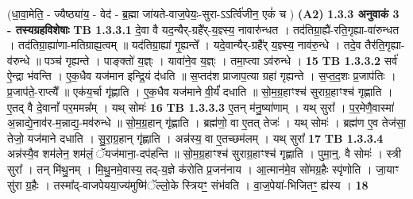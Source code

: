 \documentclass[17pt]{extarticle}
\begin{document}
                  \newline
                                    (धा॒वा॒मेति॒ - ज्यैष्ठ्या॑य॒ - वेद॑ - ब्र॒ह्मा जा॑यते-वाज॒पेयः॒-सुरा-ऽऽर्त्वि॑जीन॒ एकं॑ च ) \textbf{(A2)} \newline \newline
                \textbf{ 1.3.3      अनुवाकं   3 - तस्यग्रहविशेषाः} \newline
                                \textbf{ TB 1.3.3.1} \newline
                  दे॒वा वै यद॒न्यैर्-ग्रहै᳚र्-य॒ज्ञ्स्य॒ नावारु॑न्धत । तद॑तिग्रा॒ह्यै॑-रति॒गृह्या-वा॑रुन्धत । तद॑तिग्रा॒ह्या॑णा-मतिग्राह्य॒त्वम् ॥ यद॑तिग्रा॒ह्या॑ गृ॒ह्यन्ते᳚ । यदे॒वान्यैर्-ग्रहै᳚र् य॒ज्ञ्स्य॒ नाव॑रु॒न्धे । तदे॒व तैर॑ति॒गृह्या-व॑रुन्धे ॥ पञ्च॑ गृह्यन्ते । पाङ्क्तो॑ य॒ज्ञ्ः । यावा॑ने॒व य॒ज्ञ्ः । तमा॒प्त्वा ऽव॑रुन्धे । \textbf{ 15} \newline
                  \newline
                                \textbf{ TB 1.3.3.2} \newline
                  सर्व॑ ऐ॒न्द्रा भ॑वन्ति । ए॒क॒धैव यज॑मान इन्द्रि॒यं द॑धति ॥ स॒प्तद॑श प्राजाप॒त्या ग्रहा॑ गृह्यन्ते । स॒प्त॒द॒शः प्र॒जाप॑तिः । प्र॒जाप॑ते॒-राप्त्यै᳚ ॥ एक॑य॒र्चा गृ॑ह्णाति । ए॒क॒धैव यज॑माने वी॒र्यं॑ दधाति ॥ सो॒म॒ग्र॒हाꣳश्च॑ सुराग्र॒हाꣳश्च॑ गृह्णाति । ए॒तद् वै दे॒वानां᳚ पर॒ममन्न᳚म् । यथ् सोमः॑ \textbf{ 16} \newline
                  \newline
                                \textbf{ TB 1.3.3.3} \newline
                  ए॒तन् म॑नु॒ष्या॑णाम् । यथ् सुरा᳚ । प॒र॒मेणै॒वास्मा॑ अ॒न्नाद्ये॒नाव॑र-म॒न्नाद्य॒-मव॑रुन्धे ॥ सो॒म॒ग्र॒हान् गृ॑ह्णाति । ब्रह्म॑णो॒ वा ए॒तत् तेजः॑ । यथ् सोमः॑ । ब्रह्म॑ण ए॒व तेज॑सा॒ तेजो॒ यज॑माने दधाति । सु॒रा॒ग्र॒हान् गृ॑ह्णाति । अन्न॑स्य॒ वा ए॒तच्छम॑लम् । यथ् सुरा᳚ \textbf{ 17} \newline
                  \newline
                                \textbf{ TB 1.3.3.4} \newline
                  अन्न॑स्यै॒व शम॑लेन॒ शम॑लं॒ ॅयज॑माना॒-दप॑हन्ति ॥ सो॒म॒ग्र॒हाꣳश्च॑ सुराग्र॒हाꣳश्च॑ गृह्णाति । पुमा॒न्॒. वै सोमः॑ । स्त्री सुरा᳚ । तन् मि॑थु॒नम् । मि॒थु॒नमे॒वास्य॒ तद्-य॒ज्ञे क॑रोति प्र॒जन॑नाय । आ॒त्मान॑मे॒व सो॑मग्र॒हैः स्पृ॑णोति । जा॒याꣳ सु॑रा ग्र॒हैः । तस्मा᳚द्-वाजपेयया॒ज्य॑मुष्मि॑ॅल्लो॒के स्त्रियꣳ॒॒ संभ॑वति । वा॒ज॒पेया॑-भिजितꣳ॒॒ ह्य॑स्य । \textbf{ 18} \newline
                  \newline
\end{document}
